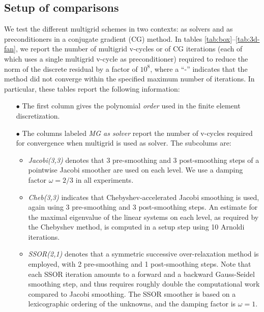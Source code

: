 \documentclass[smallcondensed,final]{svjour3}     %
\begin{document}
\subsection{Setup of comparisons}\label{subsec:measures}
We test the different multigrid schemes in two contexts: as solvers
and as preconditioners in a conjugate gradient (CG) method.  In tables
\ref{tab:box}--\ref{tab:3d-fan}, we report the number of multigrid
v-cycles or of CG iterations (each of which uses a single multigrid
v-cycle as preconditioner) required to reduce the norm of the discrete
residual by a factor of $10^8$, where a ``-'' indicates that the
method did not converge within the specified maximum number of
iterations.
In particular, these tables report the following
information:
\begin{itemize}
\item[$\bullet$] The first column gives the polynomial \emph{order}
  used in the finite element discretization.
\item[$\bullet$] The columns labeled \emph{MG as solver} report
  the number of v-cycles required for convergence when multigrid is used as
  solver. The subcolums are:
  \begin{itemize}
  \item \emph{Jacobi(3,3)} denotes that 3 pre-smoothing and 3
    post-smoothing steps of a pointwise Jacobi smoother are used on
    each level. We use a damping factor $\omega=2/3$ in all experiments.
  \item \emph{Cheb(3,3)} indicates that Chebyshev-accelerated Jacobi
    smoothing is used, again using 3 pre-smoothing and 3
    post-smoothing steps. An estimate for the maximal eigenvalue of
    the linear systems on each level, as required by the Chebyshev
    method, is computed in a setup step using 10 Arnoldi iterations.
  \item \emph{SSOR(2,1)} denotes that a symmetric successive
    over-relaxation method is employed, with 2 pre-smoothing and 1
    post-smoothing steps. Note that each SSOR iteration amounts to a
    forward and a backward Gauss-Seidel smoothing step, and thus
    requires roughly double the computational work compared to Jacobi
    smoothing.  The SSOR smoother is based on a lexicographic ordering
    of the unknowns, and the damping factor is $\omega=1$.
  \end{itemize}

\end{itemize}
\end{document}
